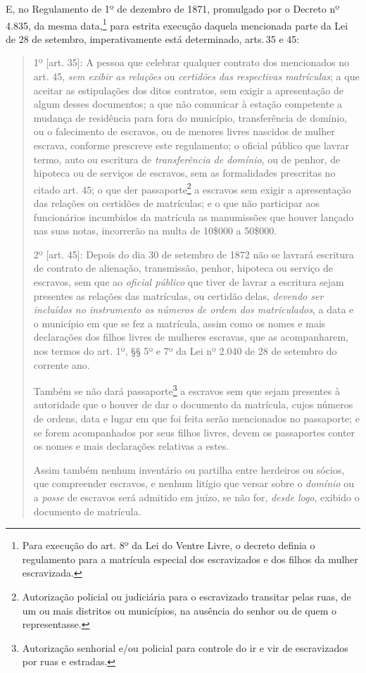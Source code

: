 E, no Regulamento de 1º de dezembro de 1871, promulgado por o Decreto nº
4.835, da mesma data,\footnote{Para execução do art. 8º da Lei do
  Ventre Livre, o decreto definia o regulamento para a matrícula
  especial dos escravizados e dos filhos da mulher escravizada.} para
estrita execução daquela mencionada parte da Lei de 28 de setembro,
imperativamente está determinado, arts.\,35 e 45:

\begin{quote}
1º {[}art. 35{]}: A pessoa que celebrar qualquer contrato dos
mencionados no art. 45, \emph{sem exibir as relações} ou \emph{certidões
das respectivas matrículas}; a que aceitar as estipulações dos ditos
contratos, sem exigir a apresentação de algum desses documentos; a que
não comunicar à estação competente a mudança de residência para fora do
município, transferência de domínio, ou o falecimento de escravos, ou de
menores livres nascidos de mulher escrava, conforme prescreve este
regulamento; o oficial público que lavrar termo, auto ou escritura de
\emph{transferência de domínio}, ou de penhor, de hipoteca ou de
serviços de escravos, sem as formalidades prescritas no citado art. 45;
o que der passaporte\footnote{Autorização policial ou judiciária para
  o escravizado transitar pelas ruas, de um ou mais distritos ou
  municípios, na ausência do senhor ou de quem o representasse.} a escravos
sem exigir a apresentação das relações ou certidões de matrículas; e o
que não participar aos funcionários incumbidos da matrícula as
manumissões que houver lançado nas suas notas, incorrerão na multa de
10\$000 a 50\$000.

2º {[}art. 45{]}: Depois do dia 30 de setembro de 1872 não se lavrará
escritura de contrato de alienação, transmissão, penhor, hipoteca ou
serviço de escravos, sem que ao \emph{oficial público} que tiver de
lavrar a escritura sejam presentes as relações das matrículas, ou
certidão delas, \emph{devendo ser incluídos no instrumento os números de
ordem dos matriculados}, a data e o município em que se fez a matrícula,
assim como os nomes e mais declarações dos filhos livres de mulheres
escravas, que as acompanharem, nos termos do art. 1º, §§ 5º e 7º da Lei
nº 2.040 de 28 de setembro do corrente ano.

Também se não dará passaporte\footnote{Autorização senhorial e/ou
  policial para controle do ir e vir de escravizados por ruas e
  estradas.} a escravos sem que sejam presentes à autoridade que o
houver de dar o documento da matrícula, cujos números de ordens, data e
lugar em que foi feita serão mencionados no passaporte; e se forem
acompanhados por seus filhos livres, devem os passaportes conter os
nomes e mais declarações relativas a estes.

Assim também nenhum inventário ou partilha entre herdeiros ou sócios,
que compreender escravos, e nenhum litígio que versar sobre o
\emph{domínio} ou a \emph{posse} de escravos será admitido em juízo, se
não for, \emph{desde logo}, exibido o documento de matrícula.
\end{quote}


